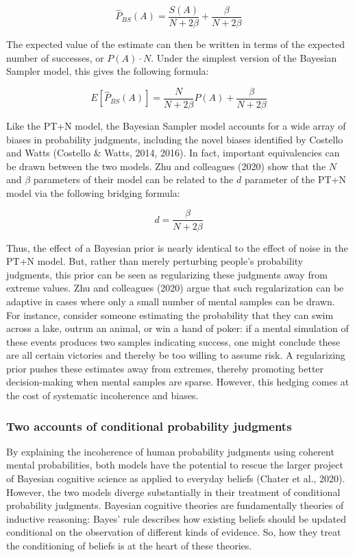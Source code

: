 \documentclass[
  english,
  man,floatsintext]{apa6}
\begin{document}
\[\hat{P}_{BS}(A) = \frac{S(A)}{N+2\beta} + \frac{\beta}{N+2\beta}\]

The expected value of the estimate can then be written in terms of the expected number of successes, or \(P(A) \cdot N\). Under the simplest version of the Bayesian Sampler model, this gives the following formula:

\[E[\hat{P}_{BS}(A)] = \frac{N}{N+2\beta}P(A) + \frac{\beta}{N+2\beta}\]

Like the PT+N model, the Bayesian Sampler model accounts for a wide array of biases in probability judgments, including the novel biases identified by Costello and Watts (Costello \& Watts, 2014, 2016). In fact, important equivalencies can be drawn between the two models. Zhu and colleagues (2020) show that the \(N\) and \(\beta\) parameters of their model can be related to the \(d\) parameter of the PT+N model via the following bridging formula:

\[d = \frac{\beta}{N+2\beta}\]

Thus, the effect of a Bayesian prior is nearly identical to the effect of noise in the PT+N model. But, rather than merely perturbing people's probability judgments, this prior can be seen as regularizing these judgments away from extreme values. Zhu and colleagues (2020) argue that such regularization can be adaptive in cases where only a small number of mental samples can be drawn. For instance, consider someone estimating the probability that they can swim across a lake, outrun an animal, or win a hand of poker: if a mental simulation of these events produces two samples indicating success, one might conclude these are all certain victories and thereby be too willing to assume risk. A regularizing prior pushes these estimates away from extremes, thereby promoting better decision-making when mental samples are sparse. However, this hedging comes at the cost of systematic incoherence and biases.

\hypertarget{two-accounts-of-conditional-probability-judgments}{%
\subsubsection{Two accounts of conditional probability judgments}\label{two-accounts-of-conditional-probability-judgments}}

By explaining the incoherence of human probability judgments using coherent mental probabilities, both models have the potential to rescue the larger project of Bayesian cognitive science as applied to everyday beliefs (Chater et al., 2020). However, the two models diverge substantially in their treatment of conditional probability judgments. Bayesian cognitive theories are fundamentally theories of inductive reasoning: Bayes' rule describes how existing beliefs should be updated conditional on the observation of different kinds of evidence. So, how they treat the conditioning of beliefs is at the heart of these theories.
\end{document}
